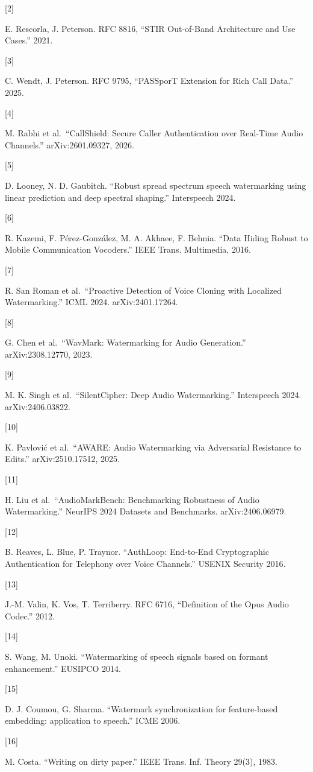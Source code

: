 \documentclass[10pt,a4paper]{article}
\begin{document}
\hypertarget{ref-2}{{[}2{]}} E. Rescorla, J. Peterson. RFC 8816, ``STIR Out-of-Band Architecture and Use Cases.'' 2021.

\hypertarget{ref-3}{{[}3{]}} C. Wendt, J. Peterson. RFC 9795, ``PASSporT Extension for Rich Call Data.'' 2025.

\hypertarget{ref-4}{{[}4{]}} M. Rabhi et al.~``CallShield: Secure Caller Authentication over Real-Time Audio Channels.'' arXiv:2601.09327, 2026.

\hypertarget{ref-5}{{[}5{]}} D. Looney, N. D. Gaubitch. ``Robust spread spectrum speech watermarking using linear prediction and deep spectral shaping.'' Interspeech 2024.

\hypertarget{ref-6}{{[}6{]}} R. Kazemi, F. Pérez-González, M. A. Akhaee, F. Behnia. ``Data Hiding Robust to Mobile Communication Vocoders.'' IEEE Trans. Multimedia, 2016.

\hypertarget{ref-7}{{[}7{]}} R. San Roman et al.~``Proactive Detection of Voice Cloning with Localized Watermarking.'' ICML 2024. arXiv:2401.17264.

\hypertarget{ref-8}{{[}8{]}} G. Chen et al.~``WavMark: Watermarking for Audio Generation.'' arXiv:2308.12770, 2023.

\hypertarget{ref-9}{{[}9{]}} M. K. Singh et al.~``SilentCipher: Deep Audio Watermarking.'' Interspeech 2024. arXiv:2406.03822.

\hypertarget{ref-10}{{[}10{]}} K. Pavlović et al.~``AWARE: Audio Watermarking via Adversarial Resistance to Edits.'' arXiv:2510.17512, 2025.

\hypertarget{ref-11}{{[}11{]}} H. Liu et al.~``AudioMarkBench: Benchmarking Robustness of Audio Watermarking.'' NeurIPS 2024 Datasets and Benchmarks. arXiv:2406.06979.

\hypertarget{ref-12}{{[}12{]}} B. Reaves, L. Blue, P. Traynor. ``AuthLoop: End-to-End Cryptographic Authentication for Telephony over Voice Channels.'' USENIX Security 2016.

\hypertarget{ref-13}{{[}13{]}} J.-M. Valin, K. Vos, T. Terriberry. RFC 6716, ``Definition of the Opus Audio Codec.'' 2012.

\hypertarget{ref-14}{{[}14{]}} S. Wang, M. Unoki. ``Watermarking of speech signals based on formant enhancement.'' EUSIPCO 2014.

\hypertarget{ref-15}{{[}15{]}} D. J. Coumou, G. Sharma. ``Watermark synchronization for feature-based embedding: application to speech.'' ICME 2006.

\hypertarget{ref-16}{{[}16{]}} M. Costa. ``Writing on dirty paper.'' IEEE Trans. Inf. Theory 29(3), 1983.
\end{document}
